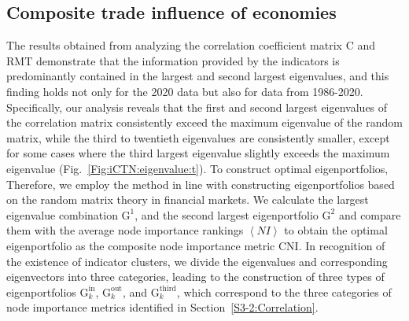 \documentclass[preprint,3p,times,sort&compress]{elsarticle}
\begin{document}
\subsection{Composite trade influence of economies}
\label{S3-3:Compositenodeimportance}





The results obtained from analyzing the correlation coefficient matrix $\mathrm{C}$ and $\mathrm{RMT}$ demonstrate that the information provided by the indicators is predominantly contained in the largest and second largest eigenvalues, and this finding holds not only for the 2020 data but also for data from 1986-2020. Specifically, our analysis reveals that the first and second largest eigenvalues of the correlation matrix consistently exceed the maximum eigenvalue of the random matrix, while the third to twentieth eigenvalues are consistently smaller, except for some cases where the third largest eigenvalue slightly exceeds the maximum eigenvalue (Fig.~\ref{Fig:iCTN:eigenvalue:t}). To construct optimal eigenportfolios, Therefore, we employ the method in line with constructing eigenportfolios based on the random matrix theory in financial markets. We calculate the largest eigenvalue combination $\mathrm{G}^{1}$, and the second largest eigenportfolio $\mathrm{G}^{2}$ and compare them with the average node importance rankings $\left\langle{NI}\right \rangle$ to obtain the optimal eigenportfolio as the composite node importance metric $\mathrm{CNI}$. In recognition of the existence of indicator clusters, we divide the eigenvalues and corresponding eigenvectors into three categories, leading to the construction of three types of eigenportfolios $\mathrm{G}^{\mathrm{in}}_k$, $\mathrm{G}^{\mathrm{out}}_k$, and $\mathrm{G}^{\mathrm{third}}_k$, which correspond to the three categories of node importance metrics identified in Section~\ref{S3-2:Correlation}.
\end{document}
